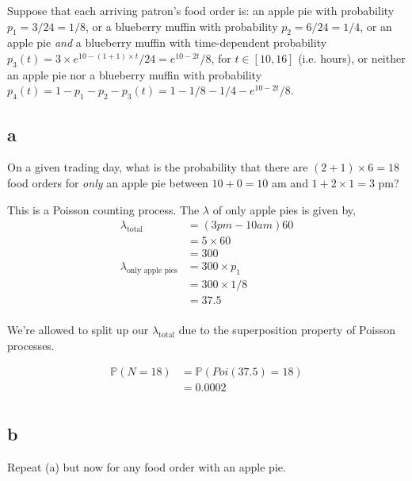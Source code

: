 \documentclass{article}
\newcommand{\prob}{\mathbb{P}}
\begin{document}
Suppose that each arriving patron's food order is: an apple pie with probability
$p_1 = 3/24 = 1/8$, or a blueberry muffin with probability $p_2 = 6/24 = 1/4$,
or an apple pie \textit{and} a blueberry muffin with time-dependent probability
$p_3(t) = 3 \times e^{10 - (1 + 1) \times t}/24
= e^{10 - 2t}/8$, for $t \in [10,16]$ (i.e. hours), or neither an apple pie nor
a blueberry muffin with probability $p_4(t) = 1 - p_1 - p_2 - p_3(t)
= 1 - 1/8 - 1/4 - e^{10 - 2t}/8$.

\subsection{a}
On a given trading day, what is the probability that there are
$(2+1) \times 6 = 18$ food orders for \textit{only} an apple pie between 
$10 + 0 = 10$ am and $1 + 2 \times 1 = 3$ pm?

This is a Poisson counting process. 
The $\lambda$ of only apple pies is given by,
\begin{align*}
    \lambda_{\text{total}} &= (3pm - 10am) 60 \\
    &= 5 \times 60 \\
    &= 300 \\
    \lambda_{\text{only apple pies}} &= 300 \times p_1 \\
    &= 300 \times 1/8 \\
    &= 37.5 \\
\end{align*}

We're allowed to split up our $\lambda_{\text{total}}$ due to the superposition
property of Poisson processes.

\begin{align*}
    \prob(N = 18) &= \prob(Poi(37.5) = 18) \\
    &= 0.0002 \\
\end{align*}

\subsection{b}
Repeat (a) but now for any food order with an apple pie.
\end{document}
